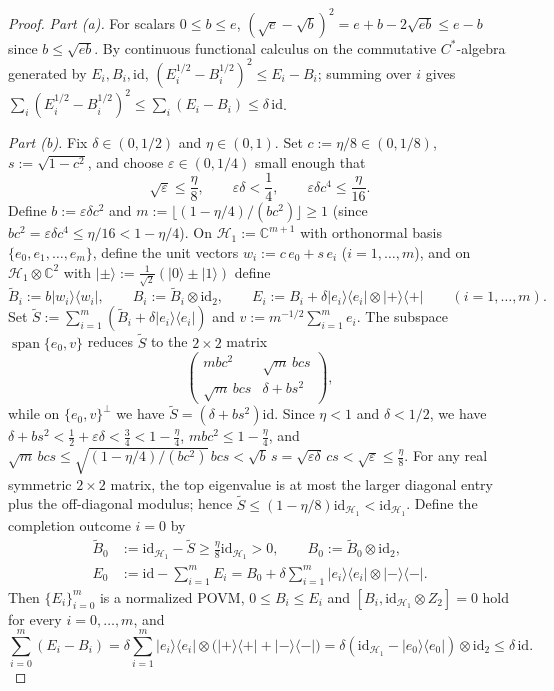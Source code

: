 \documentclass[11pt,a4paper]{article}
\theoremstyle{definition}
\theoremstyle{remark}
\newcommand{\HH}{\mathcal{H}}
\newcommand{\CC}{\mathbb{C}}
\newcommand{\id}{\mathrm{id}}
\newcommand{\ket}[1]{|#1\rangle}
\newcommand{\bra}[1]{\langle #1|}
\begin{document}
\begin{proof}
\emph{Part (a).} For scalars $0\le b\le e$, $(\sqrt{e}-\sqrt{b})^2 = e + b - 2\sqrt{eb} \le e - b$ since $b\le\sqrt{eb}$. By continuous functional calculus on the commutative $C^*$-algebra generated by $E_i, B_i, \id$, $(E_i^{1/2}-B_i^{1/2})^2 \le E_i - B_i$; summing over $i$ gives $\sum_i (E_i^{1/2}-B_i^{1/2})^2 \le \sum_i (E_i - B_i) \le \delta\,\id$.

\smallskip\noindent\emph{Part (b).} Fix $\delta\in(0,1/2)$ and $\eta\in(0,1)$. Set $c := \eta/8\in(0,1/8)$, $s := \sqrt{1-c^2}$, and choose $\varepsilon\in(0,1/4)$ small enough that
\[
\sqrt{\varepsilon} \le \frac{\eta}{8}, \qquad \varepsilon\delta < \frac{1}{4}, \qquad \varepsilon\delta c^4 \le \frac{\eta}{16}.
\]
Define $b := \varepsilon\delta c^2$ and $m := \lfloor (1-\eta/4)/(bc^2)\rfloor \ge 1$ (since $bc^2 = \varepsilon\delta c^4 \le \eta/16 < 1-\eta/4$). On $\HH_1 := \CC^{m+1}$ with orthonormal basis $\{e_0, e_1, \dots, e_m\}$, define the unit vectors $w_i := c\,e_0 + s\,e_i$ ($i=1,\dots,m$), and on $\HH_1\otimes\CC^2$ with $\ket{\pm} := \frac{1}{\sqrt{2}}(\ket{0}\pm\ket{1})$ define
\[
\widetilde{B}_i := b\ket{w_i}\bra{w_i}, \qquad B_i := \widetilde{B}_i\otimes\id_2, \qquad
E_i := B_i + \delta\ket{e_i}\bra{e_i}\otimes\ket{+}\bra{+} \qquad (i=1,\dots,m).
\]
Set $\widetilde{S} := \sum_{i=1}^m (\widetilde{B}_i + \delta\ket{e_i}\bra{e_i})$ and $v := m^{-1/2}\sum_{i=1}^m e_i$. The subspace $\operatorname{span}\{e_0, v\}$ reduces $\widetilde{S}$ to the $2\times 2$ matrix
\[
\begin{pmatrix} m b c^2 & \sqrt{m}\,b c s \\ \sqrt{m}\,b c s & \delta + b s^2 \end{pmatrix},
\]
while on $\{e_0, v\}^\perp$ we have $\widetilde{S} = (\delta + bs^2)\id$. Since $\eta < 1$ and $\delta < 1/2$, we have $\delta + bs^2 < \frac{1}{2} + \varepsilon\delta < \frac{3}{4} < 1 - \frac{\eta}{4}$, $mbc^2 \le 1 - \frac{\eta}{4}$, and $\sqrt{m}\,bcs \le \sqrt{(1-\eta/4)/(bc^2)}\,bcs < \sqrt{b}\,s = \sqrt{\varepsilon\delta}\,cs < \sqrt{\varepsilon} \le \frac{\eta}{8}$. For any real symmetric $2\times 2$ matrix, the top eigenvalue is at most the larger diagonal entry plus the off-diagonal modulus; hence $\widetilde{S} \le (1-\eta/8)\id_{\HH_1} < \id_{\HH_1}$. Define the completion outcome $i=0$ by
\begin{align*}
\widetilde{B}_0 &:= \id_{\HH_1} - \widetilde{S} \ge \frac{\eta}{8}\id_{\HH_1} > 0, \qquad
B_0 := \widetilde{B}_0\otimes\id_2, \\
E_0 &:= \id - \sum_{i=1}^m E_i = B_0 + \delta\sum_{i=1}^m \ket{e_i}\bra{e_i}\otimes\ket{-}\bra{-}.
\end{align*}
Then $\{E_i\}_{i=0}^m$ is a normalized POVM, $0\le B_i\le E_i$ and $[B_i, \id_{\HH_1}\otimes Z_2] = 0$ hold for every $i=0,\dots,m$, and
\[
\sum_{i=0}^m (E_i - B_i) = \delta\sum_{i=1}^m \ket{e_i}\bra{e_i}\otimes\bigl(\ket{+}\bra{+} + \ket{-}\bra{-}\bigr) = \delta(\id_{\HH_1}-\ket{e_0}\bra{e_0})\otimes\id_2 \le \delta\,\id.
\]


\end{proof}
\end{document}
